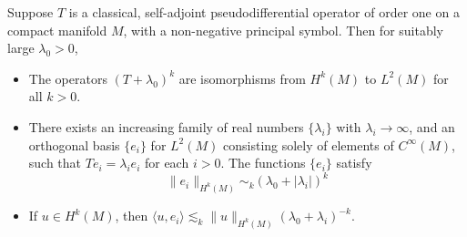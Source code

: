 \begin{theorem}
    Suppose $T$ is a classical, self-adjoint pseudodifferential operator of order one on a compact manifold $M$, with a non-negative principal symbol. Then for suitably large $\lambda_0 > 0$,
    \begin{itemize}
        \item The operators $(T + \lambda_0)^k$ are isomorphisms from $H^k(M)$ to $L^2(M)$ for all $k > 0$.

        \item There exists an increasing family of real numbers $\{ \lambda_i \}$ with $\lambda_i \to \infty$, and an orthogonal basis $\{ e_i \}$ for $L^2(M)$ consisting solely of elements of $C^\infty(M)$, such that $Te_i = \lambda_i e_i$ for each $i > 0$. The functions $\{ e_i \}$ satisfy
        \[ \| e_i \|_{H^k(M)} \sim_k (\lambda_0 + |\lambda_i|)^k \]

        \item If $u \in H^k(M)$, then $\langle u, e_i \rangle \lesssim_k \| u \|_{H^k(M)} (\lambda_0 + \lambda_i)^{-k}$.
    \end{itemize}
\end{theorem}
